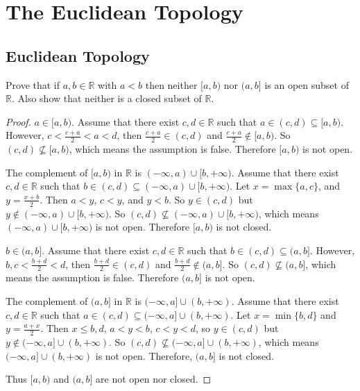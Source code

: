 \chapter{The Euclidean Topology}

\section{Euclidean Topology}

\begin{exercise}
	Prove that if $a, b\in \mathbb{R}$ with $a < b$ then neither $[a, b)$ nor $(a, b]$ is an open subset of $\mathbb{R}$. Also show that neither is a closed subset of $\mathbb{R}$.
\end{exercise}

\begin{proof}
	$a\in [a, b)$. Assume that there exist $c, d\in \mathbb{R}$ such that $a\in (c, d)\subseteq [a, b)$. However, $c < \frac{c+a}{2} < a < d$, then $\frac{c+a}{2}\in (c, d)$ and $\frac{c+a}{2}\notin [a, b)$. So $(c, d)\nsubseteq [a, b)$, which means the assumption is false. Therefore $[a, b)$ is not open.

									The complement of $[a, b)$ in $\mathbb{R}$ is $(-\infty, a)\cup [b, +\infty)$. Assume that there exist $c, d\in \mathbb{R}$ such that $b\in (c, d)\subseteq (-\infty, a)\cup [b, +\infty)$. Let $x = \max\{ a, c \}$, and $y = \frac{x + b}{2}$. Then $a < y$, $c < y$, and $y < b$. So $y\in (c, d)$ but $y\notin (-\infty, a)\cup [b, +\infty)$. So $(c, d)\nsubseteq (-\infty, a)\cup [b, +\infty)$, which means $(-\infty, a)\cup [b, +\infty)$ is not open. Therefore $[a, b)$ is not closed.

																	$b\in (a, b]$. Assume that there exist $c, d\in \mathbb{R}$ such that $b\in (c, d)\subseteq (a, b]$. However, $b, c < \frac{b+d}{2} < d$, then $\frac{b+d}{2}\in (c, d)$ and $\frac{b+d}{2}\notin (a, b]$. So $(c, d)\nsubseteq (a, b]$, which means the assumption is false. Therefore $(a, b]$ is not open.

												The complement of $(a, b]$ in $\mathbb{R}$ is $(-\infty, a]\cup (b, +\infty)$. Assume that there exist $c, d\in \mathbb{R}$ such that $a\in (c, d)\subseteq (-\infty, a]\cup (b, +\infty)$. Let $x = \min\{ b, d \}$ and $y = \frac{a+x}{2}$. Then $x\leq b, d$, $a < y < b$, $c < y < d$, so $y\in (c, d)$ but $y\notin (-\infty, a]\cup (b, +\infty)$. So $(c, d)\nsubseteq (-\infty, a]\cup (b, +\infty)$, which means $(-\infty, a]\cup (b, +\infty)$ is not open. Therefore, $(a, b]$ is not closed.

	Thus $[a, b)$ and $(a, b]$ are not open nor closed.
\end{proof}
\newpage

